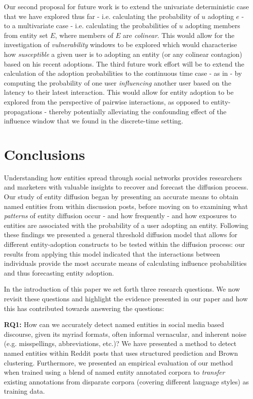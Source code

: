 \documentclass[10pt,journal,compsoc]{IEEEtran}
\begin{document}
Our second proposal for future work is to extend the univariate deterministic case that we have explored thus far - i.e. calculating the probability of $u$ adopting $e$ - to a multivariate case - i.e. calculating the probabilities of $u$ adopting members from entity set $E$, where members of $E$ are \emph{colinear}.
This would allow for the investigation of \emph{vulnerability} windows to be explored which would characterise how \emph{susceptible} a given user is to adopting an entity (or any colinear contagion) based on his recent adoptions.
The third future work effort will be to extend the calculation of the adoption probabilities to the continuous time case - as in \cite{huang2014temporal} - by computing the probability of one user \emph{influencing} another user based on the latency to their latest interaction.
This would allow for entity adoption to be explored from the perspective of pairwise interactions, as opposed to entity-propagations - thereby potentially alleviating the confounding effect of the influence window that we found in the discrete-time setting.




\section{Conclusions}
\label{sec:conclusions}
Understanding how entities spread through social networks provides researchers and marketers with valuable insights to recover and forecast the diffusion process.
Our study of entity diffusion began by presenting an accurate means to obtain named entities from within discussion posts, before moving on to examining what \emph{patterns} of entity diffusion occur - and how frequently - and how exposures to entities are associated with the probability of a user adopting an entity.
Following these findings we presented a general threshold diffusion model that allows for different entity-adoption constructs to be tested within the diffusion process: our results from applying this model indicated that the interactions between individuals provide the most accurate means of calculating influence probabilities and thus forecasting entity adoption.

In the introduction of this paper we set forth three research questions. 
We now revisit these questions and highlight the evidence presented in our paper and how this has contributed towards answering the questions:

\textbf{RQ1:} How can we accurately detect named entities in social media based discourse, given its myriad formats, often informal vernacular, and inherent noise (e.g. misspellings, abbreviations, etc.)?
We have presented a method to detect named entities within Reddit posts that uses structured prediction and Brown clustering.
Furthermore, we presented an empirical evaluation of our method when trained using a blend of named entity annotated corpora to \emph{transfer} existing annotations from disparate corpora (covering different language styles) as training data.
\end{document}
